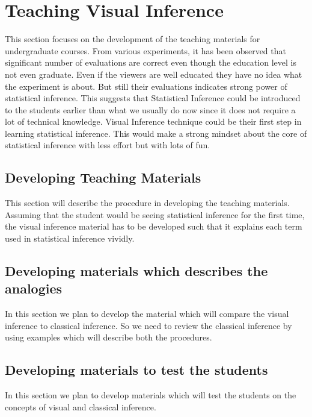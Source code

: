 %
\chapter{Teaching Visual Inference}\label{ch:teaching} This section focuses on the development of the teaching materials for undergraduate courses. From various experiments, it has been observed that significant number of evaluations are correct even though the education level is not even graduate. Even if the viewers are well educated they have no idea what the experiment is about. But still their evaluations indicates strong power of statistical inference. This suggests that Statistical Inference could be introduced to the students earlier than what we usually do now since it does not require a lot of technical knowledge. Visual Inference technique could be their first step in learning statistical inference. This would make a strong mindset about the core of statistical inference with less effort but with lots of fun.   


\section{Developing Teaching Materials} This section will describe the procedure in developing the teaching materials. Assuming that the student would be seeing statistical inference for the first time, the visual inference material has to be developed such that it explains each term used in statistical inference vividly.

\section{Developing materials which describes the analogies} In this section we plan to develop the material which will compare the visual inference to classical inference. So we need to review the classical inference by using examples which will describe both the procedures.

\section{Developing materials to test the students} In this section we plan to develop materials which will test the students on the concepts of visual and classical inference.

